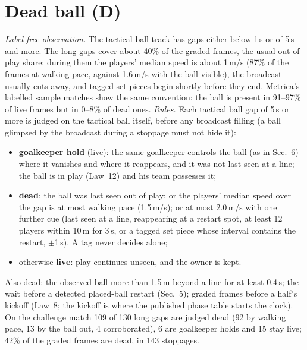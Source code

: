 \documentclass[10pt,a4paper]{article}
\begin{document}
\section{Dead ball (D)}
\emph{Label-free observation.} The tactical ball track has gaps either below 1\,s or of 5\,s and more. The long gaps cover about
40\% of the graded frames, the usual out-of-play share; during them the players' median speed is about 1\,m/s (87\% of the
frames at walking pace, against 1.6\,m/s with the ball visible), the broadcast usually cuts away, and tagged set pieces begin
shortly before they end. Metrica's labelled sample matches show the same convention: the ball is present in 91--97\% of live
frames but in 0--8\% of dead ones. \emph{Rules.} Each tactical ball gap of 5\,s or more is judged on the tactical ball itself,
before any broadcast filling (a ball glimpsed by the broadcast during a stoppage must not hide it):
\begin{itemize}
\item \textbf{goalkeeper hold} (live): the same goalkeeper controls the ball (as in Sec.~6) where it vanishes and where it
      reappears, and it was not last seen at a line; the ball is in play (Law~12) and his team possesses it;
\item \textbf{dead}: the ball was last seen out of play; or the players' median speed over the gap is at most walking pace
      (1.5\,m/s); or at most 2.0\,m/s with one further cue (last seen at a line, reappearing at a restart spot, at least 12
      players within 10\,m for 3\,s, or a tagged set piece whose interval contains the restart, $\pm$1\,s). A tag never decides alone;
\item otherwise \textbf{live}: play continues unseen, and the owner is kept.
\end{itemize}
Also dead: the observed ball more than 1.5\,m beyond a line for at least 0.4\,s; the wait before a detected placed-ball restart
(Sec.~5); graded frames before a half's kickoff (Law~8; the kickoff is where the published phase table starts the clock). On the
challenge match 109 of 130 long gaps are judged dead (92 by walking pace, 13 by the ball out, 4 corroborated), 6 are goalkeeper
holds and 15 stay live; 42\% of the graded frames are dead, in 143 stoppages.
\end{document}
